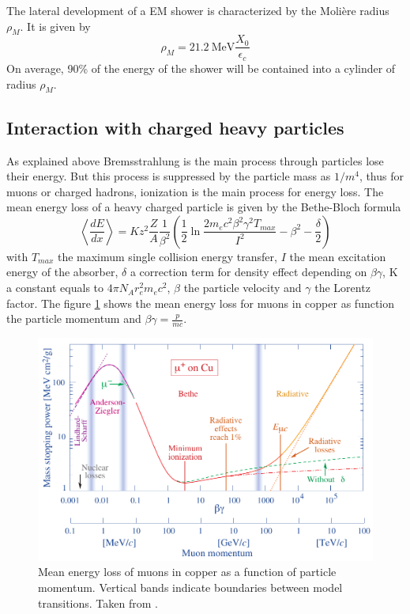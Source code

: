 The lateral development of a EM shower is characterized by the Moli\`ere radius $\rho_{M}$. It is given by \cite{Wigmans:392793}
\begin{equation}
  \rho_{M} = \SI{21.2}{\mega\eV} \frac{X_0}{\epsilon_c}
\end{equation}
On average, 90\% of the energy of the shower will be contained into a cylinder of radius $\rho_{M}$.

\subsection{Interaction with charged heavy particles}

As explained above Bremsstrahlung is the main process through particles lose their energy. But this process is suppressed by the particle mass as $1/m^4$, thus for muons or charged hadrons, ionization is the main process for energy loss. The mean energy loss of a heavy charged particle is given by the Bethe-Bloch formula \cite{Wigmans:392793}
\begin{equation}
\left<\frac{dE}{dx}\right> = Kz^2\frac{Z}{A}\frac{1}{\beta^2}\left(\frac{1}{2}\ln\frac{2m_ec^2\beta^2\gamma^2T_{max}}{I^2} - \beta^2 - \frac{\delta}{2}\right)
\end{equation}
with $T_{max}$ the maximum single collision energy transfer, $I$ the mean excitation energy of the absorber, $\delta$ a correction term for density effect depending on $\beta\gamma$, K a constant equals to $4\pi{}N_Ar_e^2m_ec^2$, $\beta$ the particle velocity and $\gamma$ the Lorentz factor. The figure \ref{fig:BetheBloch} shows the mean energy loss for muons in copper as function the particle momentum and $\beta\gamma = \frac{p}{mc}$.

\begin{figure}[htbp!]
  \centering
  \includegraphics[width=0.7\linewidth]{chap2/fig/rpp_icru49_cu_col.pdf}
  \caption{Mean energy loss of muons in copper as a function of particle momentum. Vertical bands indicate boundaries between model transitions. Taken from \cite{Patrignani:2016xqp}.} \label{fig:BetheBloch}
\end{figure}

